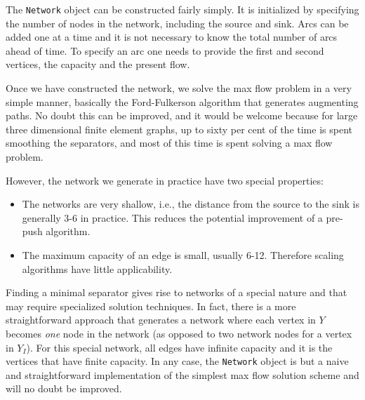 \par
The {\tt Network} object can be constructed fairly simply.
It is initialized by specifying the number of nodes in the network,
including the source and sink.
Arcs can be added one at a time and it is not necessary to know
the total number of arcs ahead of time.
To specify an arc one needs to provide the first and second
vertices, the capacity and the present flow.
\par
Once we have constructed the network, we solve the max flow problem
in a very simple manner, basically the Ford-Fulkerson algorithm
that generates augmenting paths.
No doubt this can be improved, and it would be welcome because for
large three dimensional finite element graphs, up to sixty per cent
of the time is spent smoothing the separators, and most of this
time is spent solving a max flow problem.
\par
However, the network we generate in practice have 
two special properties:
\begin{itemize}
\item
The networks are very shallow, i.e., the distance from the source
to the sink is generally 3-6 in practice.
This reduces the potential improvement of a pre-push algorithm.
\item
The maximum capacity of an edge is small, usually 6-12.
Therefore scaling algorithms have little applicability.
\end{itemize}
Finding a minimal separator gives rise to networks of a special
nature and that may require specialized solution techniques.
In fact, there is a more straightforward approach that generates a
network where each vertex in $Y$ becomes {\it one} node in the
network (as opposed to two network nodes for a vertex in $Y_I$).
For this special network, all edges have infinite capacity and it
is the vertices that have finite capacity.
In any case, the {\tt Network} object is but a naive and
straightforward implementation of the simplest max flow solution
scheme and will no doubt be improved.
